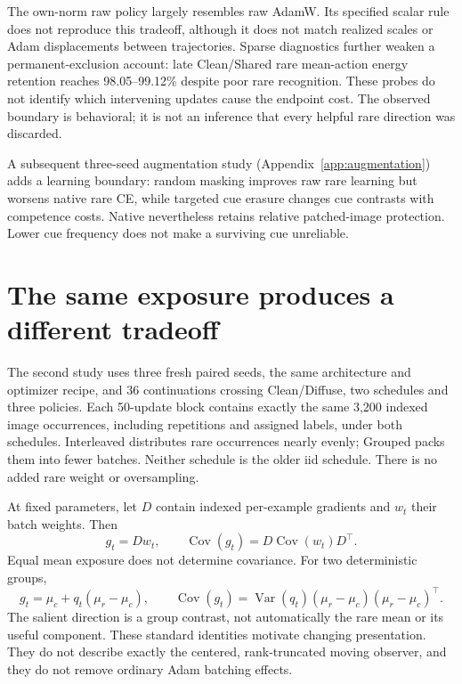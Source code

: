 \documentclass[10pt]{article}
\newcommand{\Cov}{\operatorname{Cov}}
\begin{document}
The own-norm raw policy largely resembles raw AdamW. Its specified scalar rule does not reproduce this tradeoff, although it does not match realized scales or Adam displacements between trajectories. Sparse diagnostics further weaken a permanent-exclusion account: late Clean/Shared rare mean-action energy retention reaches 98.05--99.12\% despite poor rare recognition. These probes do not identify which intervening updates cause the endpoint cost. The observed boundary is behavioral; it is not an inference that every helpful rare direction was discarded.

A subsequent three-seed augmentation study (Appendix~\ref{app:augmentation}) adds a learning boundary: random masking improves raw rare learning but worsens native rare CE, while targeted cue erasure changes cue contrasts with competence costs. Native nevertheless retains relative patched-image protection. Lower cue frequency does not make a surviving cue unreliable.

\section{The same exposure produces a different tradeoff}
\label{sec:batch}
The second study uses three fresh paired seeds, the same architecture and optimizer recipe, and 36 continuations crossing Clean/Diffuse, two schedules and three policies. Each 50-update block contains exactly the same 3,200 indexed image occurrences, including repetitions and assigned labels, under both schedules. Interleaved distributes rare occurrences nearly evenly; Grouped packs them into fewer batches. Neither schedule is the older iid schedule. There is no added rare weight or oversampling.

At fixed parameters, let $D$ contain indexed per-example gradients and $w_t$ their batch weights. Then
\begin{equation}
g_t=Dw_t,\qquad \Cov(g_t)=D\Cov(w_t)D^\top.
\end{equation}
Equal mean exposure does not determine covariance. For two deterministic groups,
\begin{equation}
g_t=\mu_c+q_t(\mu_r-\mu_c),\qquad
\Cov(g_t)=\operatorname{Var}(q_t)(\mu_r-\mu_c)(\mu_r-\mu_c)^\top.
\end{equation}
The salient direction is a group contrast, not automatically the rare mean or its useful component. These standard identities motivate changing presentation. They do not describe exactly the centered, rank-truncated moving observer, and they do not remove ordinary Adam batching effects.
\end{document}
